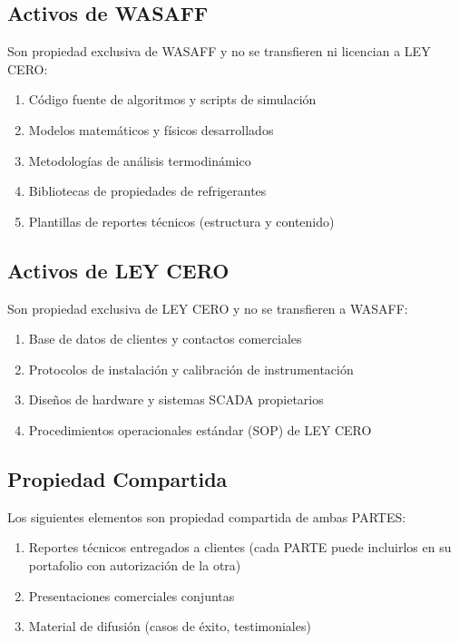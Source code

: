 \documentclass[11pt,letterpaper]{article}
\begin{document}
\subsection{Activos de WASAFF}

Son propiedad exclusiva de WASAFF y no se transfieren ni licencian a LEY CERO:

\begin{enumerate}[label=\alph*)]
    \item Código fuente de algoritmos y scripts de simulación
    \item Modelos matemáticos y físicos desarrollados
    \item Metodologías de análisis termodinámico
    \item Bibliotecas de propiedades de refrigerantes
    \item Plantillas de reportes técnicos (estructura y contenido)
\end{enumerate}

\subsection{Activos de LEY CERO}

Son propiedad exclusiva de LEY CERO y no se transfieren a WASAFF:

\begin{enumerate}[label=\alph*)]
    \item Base de datos de clientes y contactos comerciales
    \item Protocolos de instalación y calibración de instrumentación
    \item Diseños de hardware y sistemas SCADA propietarios
    \item Procedimientos operacionales estándar (SOP) de LEY CERO
\end{enumerate}

\subsection{Propiedad Compartida}

Los siguientes elementos son propiedad compartida de ambas PARTES:

\begin{enumerate}[label=\alph*)]
    \item Reportes técnicos entregados a clientes (cada PARTE puede incluirlos en su portafolio con autorización de la otra)
    \item Presentaciones comerciales conjuntas
    \item Material de difusión (casos de éxito, testimoniales)
\end{enumerate}
\end{document}
